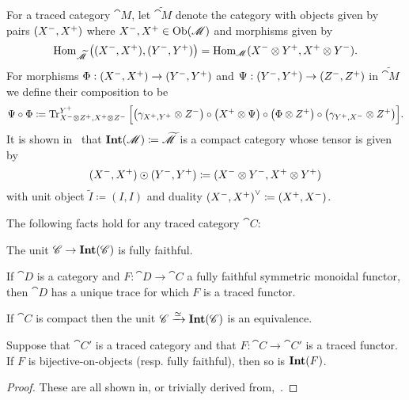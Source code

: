 \documentclass[12pt,oneside,article,draft]{memoir}
\begin{document}
For a traced category $\cat{M}$, let $\widetilde{\cat{M}}$ denote the category with
objects given by pairs $(X^-,X^+)$ where $X^-,X^+\in \operatorname{Ob}(\mathscr{M})$ and morphisms
given by
\[
   \operatorname{Hom}_{\widetilde{\mathscr{M}}}\big((X^-,X^+),(Y^-,Y^+)\big)=\operatorname{Hom}_{\mathscr{M}}(X^-\otimes Y^+,X^+\otimes Y^-).
\]
For morphisms $\Phi:(X^-,X^+)\to(Y^-,Y^+)$ and $\Psi:(Y^-,Y^+)\to(Z^-,Z^+)$ in $\widetilde{\cat{M}}$ we define their composition to be
\[
   \Psi\circ\Phi\coloneqq\operatorname{Tr}^{Y^+}_{X^-\otimes Z^+,X^+\otimes Z^-}\Big[\big(\gamma_{X^+,Y^+}\otimes Z^-\big)\circ\big(X^+\otimes\Psi\big)\circ\big(\Phi\otimes Z^+\big)\circ\big(\gamma_{Y^+,X^-}\otimes Z^+\big)\Big].
\]
It is shown in~\cite{JoyalStreetVerity} that $\mathbf{Int}(\mathscr{M})\coloneqq\widetilde{\mathscr{M}}$ is a compact category whose tensor is given by
\[
   (X^-,X^+)\odot(Y^-,Y^+)\coloneqq(X^-\otimes Y^-,X^+\otimes Y^+)
\]
with unit object $\tilde I\coloneqq(I,I)$ and duality ${(X^-,X^+)}^\vee\coloneqq(X^+,X^-)$.


%
%
%

\begin{lemma}\label{lemma:fully_faithful_and_trace}
The following facts hold for any traced category $\cat{C}$:
\begin{compactenum}[\quad i.]
   \item The unit $\mathscr{C}\to\mathbf{Int}(\mathscr{C})$ is fully faithful.
   \item If $\cat{D}$ is a category and $F\colon\cat{D}\to\cat{C}$ a fully faithful symmetric
      monoidal functor, then $\cat{D}$ has a unique trace for which $F$ is a traced functor.
   \item If $\cat{C}$ is compact then the unit $\mathscr{C}\xrightarrow{\simeq}\mathbf{Int}(\mathscr{C})$ is an equivalence.
   \item Suppose that $\cat{C'}$ is a traced category and that $F\colon \cat{C}\to \cat{C}'$ is a traced functor. If $F$ is bijective-on-objects (resp. fully faithful), then so is $\mathbf{Int}(F)$.
\end{compactenum}
\end{lemma}
\begin{proof}
   These are all shown in, or trivially derived from,~\cite{JoyalStreetVerity}.
\end{proof}
\end{document}
